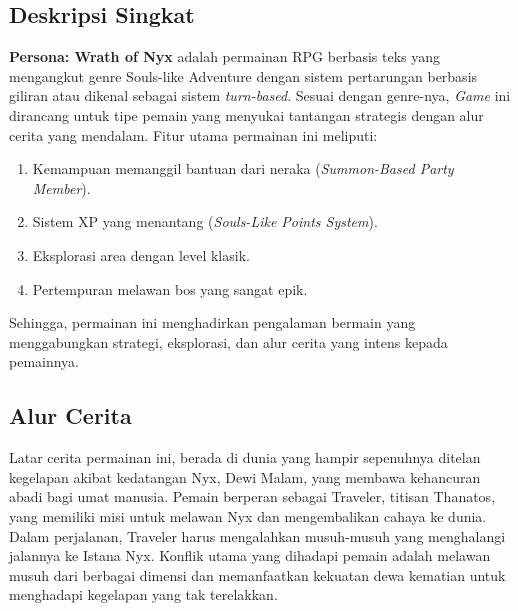 \documentclass[12pt]{article}
\begin{document}
    \subsection{Deskripsi Singkat}
        \textbf{Persona: Wrath of Nyx} adalah permainan RPG berbasis teks yang mengangkut genre Souls-like Adventure dengan sistem pertarungan berbasis giliran atau dikenal sebagai sistem \textit{turn-based}. Sesuai dengan genre-nya, \textit{Game} ini dirancang untuk tipe pemain yang menyukai tantangan strategis dengan alur cerita yang mendalam.
        Fitur utama permainan ini meliputi:
        \begin{enumerate}
            \item Kemampuan memanggil bantuan dari neraka (\textit{Summon-Based Party Member}).
            \item Sistem XP yang menantang (\textit{Souls-Like Points System}).
            \item Eksplorasi area dengan level klasik.
            \item Pertempuran melawan bos yang sangat epik.
        \end{enumerate}
        Sehingga, permainan ini menghadirkan pengalaman bermain yang menggabungkan strategi, eksplorasi, dan alur cerita yang intens kepada pemainnya.
    \subsection{Alur Cerita}
        Latar cerita permainan ini, berada di dunia yang hampir sepenuhnya ditelan kegelapan akibat kedatangan Nyx, Dewi Malam, yang membawa kehancuran abadi bagi umat manusia. Pemain berperan sebagai Traveler, titisan Thanatos, yang memiliki misi untuk melawan Nyx dan mengembalikan cahaya ke dunia. Dalam perjalanan, Traveler harus mengalahkan musuh-musuh yang menghalangi jalannya ke Istana Nyx. Konflik utama yang dihadapi pemain adalah melawan musuh dari berbagai dimensi dan memanfaatkan kekuatan dewa kematian untuk menghadapi kegelapan yang tak terelakkan.
\end{document}
